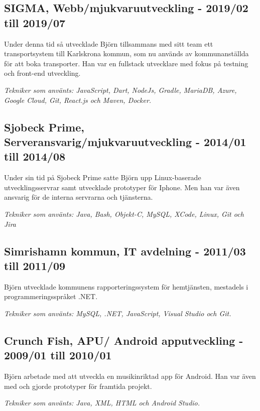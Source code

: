 \begin{minipage}[t]{0.7\textwidth}
    \vspace{15pt} %
    \subsection*{\textcolor{colorTitelErfarenhet}{SIGMA, Webb/mjukvaruutveckling - 2019/02 till 2019/07}}
    Under denna tid så utvecklade Björn tillsammans med sitt team ett transportsystem 
    till Karlskrona kommun, som nu används av kommunanställda för att boka transporter. 
    Han var en fullstack utvecklare med fokus på testning och front-end utveckling.
    
    \vspace{5pt}\textit{Tekniker som använts: JavaScript, Dart, NodeJs, Gradle, MariaDB, Azure, Google Cloud, Git, React.js och Maven, Docker.} 
    
  
    \vspace{15pt} %
    \subsection*{\textcolor{colorTitelErfarenhet}{Sjobeck Prime, Serveransvarig/mjukvaruutveckling - 2014/01 till 2014/08}}
    Under sin tid på Sjobeck Prime satte Björn upp Linux-baserade utvecklingsservrar samt utvecklade 
    prototyper för Iphone. Men han var även ansvarig för de interna servrarna och tjänsterna.
    
    \vspace{5pt}\textit{Tekniker som använts: Java, Bash, Objekt-C, MySQL, XCode, Linux, Git och Jira} 
      
  
    \vspace{15pt} %
    \subsection*{\textcolor{colorTitelErfarenhet}{Simrishamn kommun, IT avdelning - 2011/03 till 2011/09}}
    Björn utvecklade kommunens rapporteringssystem för hemtjänsten, mestadels i programmeringsspråket .NET.
    
    \vspace{5pt}\textit{Tekniker som använts: MySQL, .NET, JavaScript, Visual Studio och Git.}
      
  
    \vspace{15pt} %
    \subsection*{\textcolor{colorTitelErfarenhet}{Crunch Fish, APU/ Android apputveckling - 2009/01 till 2010/01}}
    Björn arbetade med att utveckla en musikinriktad app för Android. Han var även med och gjorde prototyper för framtida projekt.
    
    \vspace{5pt}\textit{Tekniker som använts: Java, XML, HTML och Android Studio.}
\end{minipage}%